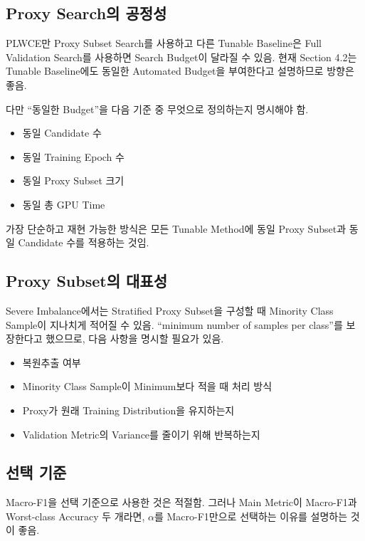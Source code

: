 \documentclass[11pt,a4paper]{article}
\begin{document}
\subsection{Proxy Search의 공정성}

PLWCE만 Proxy Subset Search를 사용하고 다른 Tunable Baseline은 Full Validation Search를 사용하면 Search Budget이 달라질 수 있음. 현재 Section 4.2는 Tunable Baseline에도 동일한 Automated Budget을 부여한다고 설명하므로 방향은 좋음.

다만 ``동일한 Budget''을 다음 기준 중 무엇으로 정의하는지 명시해야 함.

\begin{itemize}
\item 동일 Candidate 수
\item 동일 Training Epoch 수
\item 동일 Proxy Subset 크기
\item 동일 총 GPU Time
\end{itemize}

가장 단순하고 재현 가능한 방식은 모든 Tunable Method에 동일 Proxy Subset과 동일 Candidate 수를 적용하는 것임.

\subsection{Proxy Subset의 대표성}

Severe Imbalance에서는 Stratified Proxy Subset을 구성할 때 Minority Class Sample이 지나치게 적어질 수 있음. ``minimum number of samples per class''를 보장한다고 했으므로, 다음 사항을 명시할 필요가 있음.

\begin{itemize}
\item 복원추출 여부
\item Minority Class Sample이 Minimum보다 적을 때 처리 방식
\item Proxy가 원래 Training Distribution을 유지하는지
\item Validation Metric의 Variance를 줄이기 위해 반복하는지
\end{itemize}

\subsection{선택 기준}

Macro-F1을 선택 기준으로 사용한 것은 적절함. 그러나 Main Metric이 Macro-F1과 Worst-class Accuracy 두 개라면, \(\alpha\)를 Macro-F1만으로 선택하는 이유를 설명하는 것이 좋음.
\end{document}

